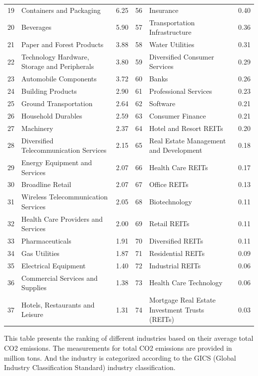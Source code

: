 \documentclass[12pt]{article}
\begin{document}
\begin{landscape}
\begin{table}[!ht]
\begin{tabular}{clcclc}
19 & Containers and Packaging & 6.25 & 56 & Insurance & 0.40 \\
20 & Beverages & 5.90 & 57 & Transportation Infrastructure & 0.36 \\
21 & Paper and Forest Products & 3.88 & 58 & Water Utilities & 0.31 \\
22 & Technology Hardware, Storage and Peripherals & 3.80 & 59 & Diversified Consumer Services & 0.29 \\
23 & Automobile Components & 3.72 & 60 & Banks & 0.26 \\
24 & Building Products & 2.90 & 61 & Professional Services & 0.23 \\
25 & Ground Transportation & 2.64 & 62 & Software & 0.21 \\
26 & Household Durables & 2.59 & 63 & Consumer Finance & 0.21 \\
27 & Machinery & 2.37 & 64 & Hotel and Resort REITs & 0.20 \\
28 & Diversified Telecommunication Services & 2.15 & 65 & Real Estate Management and Development & 0.18 \\
29 & Energy Equipment and Services & 2.07 & 66 & Health Care REITs & 0.17 \\
30 & Broadline Retail & 2.07 & 67 & Office REITs & 0.13 \\
31 & Wireless Telecommunication Services & 2.05 & 68 & Biotechnology & 0.11 \\
32 & Health Care Providers and Services & 2.00 & 69 & Retail REITs & 0.11 \\
33 & Pharmaceuticals & 1.91 & 70 & Diversified REITs & 0.11 \\
34 & Gas Utilities & 1.87 & 71 & Residential REITs & 0.09 \\
35 & Electrical Equipment & 1.40 & 72 & Industrial REITs & 0.06 \\
36 & Commercial Services and Supplies & 1.38 & 73 & Health Care Technology & 0.06 \\
37 & Hotels, Restaurants and Leisure & 1.31 & 74 & Mortgage Real Estate Investment Trusts (REITs) & 0.03 \\
\bottomrule
\end{tabular}
\begin{tablenotes}
\footnotesize
\item This table presents the ranking of different industries based on their average total CO2 emissions. The measurements for total CO2 emissions are provided in million tons. And the industry is categorized according to the GICS (Global Industry Classification Standard) industry classification.
\end{tablenotes}
\end{table}
\end{landscape}
\clearpage
\end{document}
